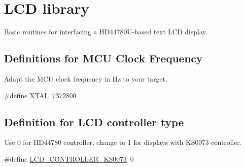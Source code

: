 \hypertarget{group__pfleury__lcd}{}\section{L\+CD library}
\label{group__pfleury__lcd}


Basic routines for interfacing a H\+D44780\+U-\/based text L\+CD display.  


\subsection*{Definitions for M\+CU Clock Frequency}
\label{_amgrp979ab56397d6df9be3f6d47932834ef0}%
Adapt the M\+CU clock frequency in Hz to your target. \begin{DoxyCompactItemize}
\item 
\#define \hyperlink{group__pfleury__lcd_ga3cad0f9b3c40159bd2fbd7f5e60f2fff}{X\+T\+AL}~7372800
\end{DoxyCompactItemize}
\subsection*{Definition for L\+CD controller type}
\label{_amgrp9cebaa2a52e46760a474a1905c7f53a9}%
Use 0 for H\+D44780 controller, change to 1 for displays with K\+S0073 controller. \begin{DoxyCompactItemize}
\item 
\#define \hyperlink{group__pfleury__lcd_ga63574b03f72a197aeee823aae95dc3b7}{L\+C\+D\+\_\+\+C\+O\+N\+T\+R\+O\+L\+L\+E\+R\+\_\+\+K\+S0073}~0
\end{DoxyCompactItemize}
